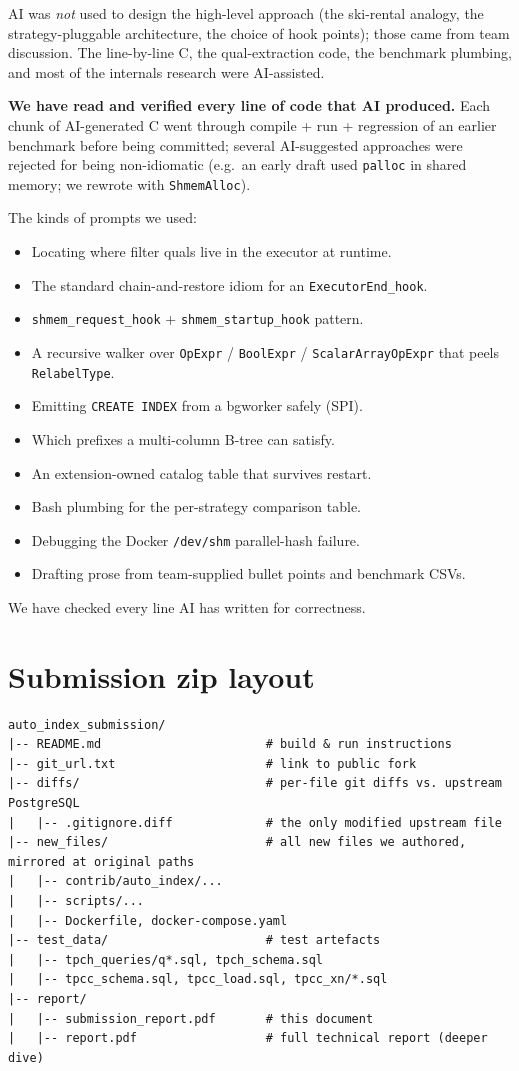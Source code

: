 \documentclass[10pt,a4paper]{article}
\newcommand{\code}[1]{\texttt{\small #1}}
\begin{document}
AI was \emph{not} used to design the high-level approach (the
ski-rental analogy, the strategy-pluggable architecture, the choice
of hook points); those came from team discussion. The line-by-line
C, the qual-extraction code, the benchmark plumbing, and most of
the internals research were AI-assisted.

\textbf{We have read and verified every line of code that AI
produced.} Each chunk of AI-generated C went through compile + run +
regression of an earlier benchmark before being committed; several
AI-suggested approaches were rejected for being non-idiomatic
(e.g.\ an early draft used \code{palloc} in shared memory; we
rewrote with \code{ShmemAlloc}).

The kinds of prompts we used:

\begin{itemize}
\item Locating where filter quals live in the executor at runtime.
\item The standard chain-and-restore idiom for an \code{ExecutorEnd\_hook}.
\item \code{shmem\_request\_hook} + \code{shmem\_startup\_hook} pattern.
\item A recursive walker over \code{OpExpr} / \code{BoolExpr} /
      \code{ScalarArrayOpExpr} that peels \code{RelabelType}.
\item Emitting \code{CREATE INDEX} from a bgworker safely (SPI).
\item Which prefixes a multi-column B-tree can satisfy.
\item An extension-owned catalog table that survives restart.
\item Bash plumbing for the per-strategy comparison table.
\item Debugging the Docker \code{/dev/shm} parallel-hash failure.
\item Drafting prose from team-supplied bullet points and benchmark CSVs.
\end{itemize}

We have checked every line AI has written for correctness.

\section{Submission zip layout}

\begin{verbatim}
auto_index_submission/
|-- README.md                       # build & run instructions
|-- git_url.txt                     # link to public fork
|-- diffs/                          # per-file git diffs vs. upstream PostgreSQL
|   |-- .gitignore.diff             # the only modified upstream file
|-- new_files/                      # all new files we authored, mirrored at original paths
|   |-- contrib/auto_index/...
|   |-- scripts/...
|   |-- Dockerfile, docker-compose.yaml
|-- test_data/                      # test artefacts
|   |-- tpch_queries/q*.sql, tpch_schema.sql
|   |-- tpcc_schema.sql, tpcc_load.sql, tpcc_xn/*.sql
|-- report/
|   |-- submission_report.pdf       # this document
|   |-- report.pdf                  # full technical report (deeper dive)
\end{verbatim}
\end{document}
